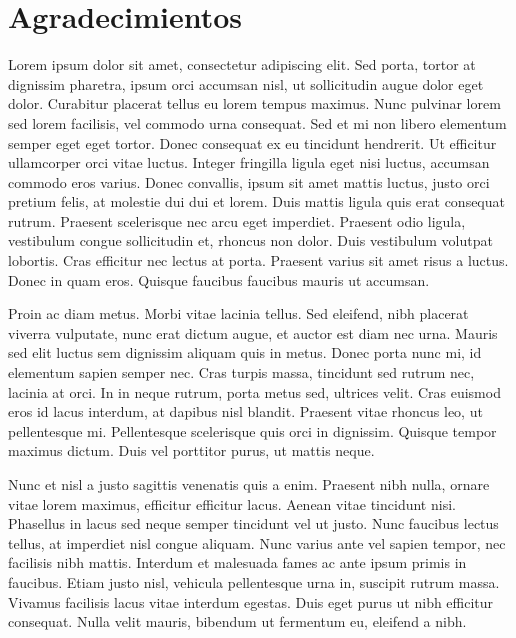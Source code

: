 
\begingroup
\let\clearpage\relax
\let\cleardoublepage\relax
\let\cleardoublepage\relax
\chapter*{Agradecimientos}

 Lorem ipsum dolor sit amet, consectetur adipiscing elit. Sed porta, tortor at dignissim pharetra, ipsum orci accumsan nisl, ut sollicitudin augue dolor eget dolor. Curabitur placerat tellus eu lorem tempus maximus. Nunc pulvinar lorem sed lorem facilisis, vel commodo urna consequat. Sed et mi non libero elementum semper eget eget tortor. Donec consequat ex eu tincidunt hendrerit. Ut efficitur ullamcorper orci vitae luctus. Integer fringilla ligula eget nisi luctus, accumsan commodo eros varius. Donec convallis, ipsum sit amet mattis luctus, justo orci pretium felis, at molestie dui dui et lorem. Duis mattis ligula quis erat consequat rutrum. Praesent scelerisque nec arcu eget imperdiet. Praesent odio ligula, vestibulum congue sollicitudin et, rhoncus non dolor. Duis vestibulum volutpat lobortis. Cras efficitur nec lectus at porta. Praesent varius sit amet risus a luctus. Donec in quam eros. Quisque faucibus faucibus mauris ut accumsan.

Proin ac diam metus. Morbi vitae lacinia tellus. Sed eleifend, nibh placerat viverra vulputate, nunc erat dictum augue, et auctor est diam nec urna. Mauris sed elit luctus sem dignissim aliquam quis in metus. Donec porta nunc mi, id elementum sapien semper nec. Cras turpis massa, tincidunt sed rutrum nec, lacinia at orci. In in neque rutrum, porta metus sed, ultrices velit. Cras euismod eros id lacus interdum, at dapibus nisl blandit. Praesent vitae rhoncus leo, ut pellentesque mi. Pellentesque scelerisque quis orci in dignissim. Quisque tempor maximus dictum. Duis vel porttitor purus, ut mattis neque.

Nunc et nisl a justo sagittis venenatis quis a enim. Praesent nibh nulla, ornare vitae lorem maximus, efficitur efficitur lacus. Aenean vitae tincidunt nisi. Phasellus in lacus sed neque semper tincidunt vel ut justo. Nunc faucibus lectus tellus, at imperdiet nisl congue aliquam. Nunc varius ante vel sapien tempor, nec facilisis nibh mattis. Interdum et malesuada fames ac ante ipsum primis in faucibus. Etiam justo nisl, vehicula pellentesque urna in, suscipit rutrum massa. Vivamus facilisis lacus vitae interdum egestas. Duis eget purus ut nibh efficitur consequat. Nulla velit mauris, bibendum ut fermentum eu, eleifend a nibh.

\endgroup
